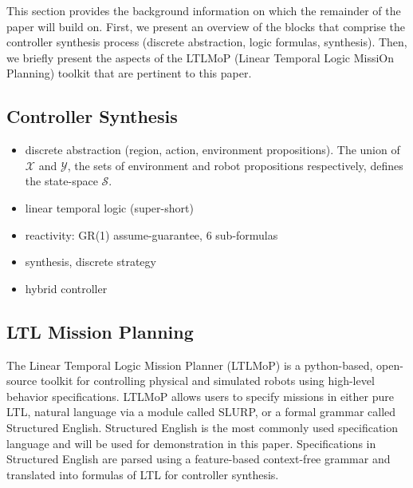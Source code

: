 This section provides the background information on which the remainder of the paper will build on. First, we present an overview of the blocks that comprise the controller synthesis process (discrete abstraction, logic formulas, synthesis). Then, we briefly present the aspects of the LTLMoP (Linear Temporal Logic MissiOn Planning) toolkit that are pertinent to this paper.

\subsection{Controller Synthesis}

\begin{itemize}
	\item discrete abstraction (region, action, environment propositions). The union of $\mathcal{X}$ and $\mathcal{Y}$, the sets of environment and robot propositions respectively, defines the state-space $\mathcal{S}$.
	\item linear temporal logic (super-short)
	\item reactivity: GR(1) assume-guarantee, 6 sub-formulas
	\item synthesis, discrete strategy
	\item hybrid controller
\end{itemize}

\subsection{LTL Mission Planning}

The Linear Temporal Logic Mission Planner (LTLMoP) \cite{Finucane2010} is a python-based, open-source toolkit for controlling physical and simulated robots using high-level behavior specifications. LTLMoP allows users to specify missions in either pure LTL, natural language via a module called SLURP, or a formal grammar called Structured English. Structured English is the most commonly used specification language and will be used for demonstration in this paper. Specifications in Structured English are parsed using a feature-based context-free grammar and translated into formulas of LTL for controller synthesis. 